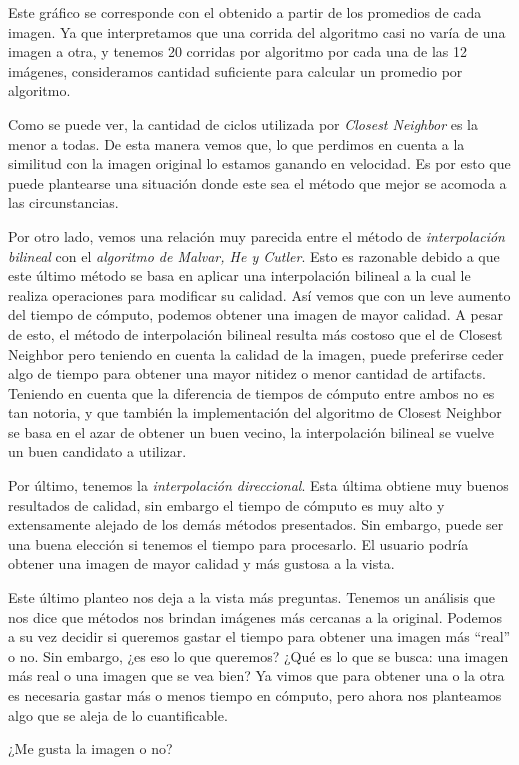 \begin{itemize}
Este gráfico se corresponde con el obtenido a partir de los promedios de cada imagen. Ya que interpretamos que una corrida del algoritmo casi no varía de una imagen a otra, y tenemos 20 corridas por algoritmo por cada una de las 12 imágenes, consideramos cantidad suficiente para calcular un promedio por algoritmo.

Como se puede ver, la cantidad de ciclos utilizada por \textit{Closest Neighbor} es la menor a todas. De esta manera vemos que, lo que perdimos en cuenta a la similitud con la imagen original lo estamos ganando en velocidad. Es por esto que puede plantearse una situación donde este sea el método que mejor se acomoda a las circunstancias. 

Por otro lado, vemos una relación muy parecida entre el método de \textit{interpolación bilineal} con el \textit{algoritmo de Malvar, He y Cutler}. Esto es razonable debido a que este último método se basa en aplicar una interpolación bilineal a la cual le realiza operaciones para modificar su calidad. Así vemos que con un leve aumento del tiempo de cómputo, podemos obtener una imagen de mayor calidad. A pesar de esto, el método de interpolación bilineal resulta más costoso que el de Closest Neighbor pero teniendo en cuenta la calidad de la imagen, puede preferirse ceder algo de tiempo para obtener una mayor nitidez o menor cantidad de artifacts. Teniendo en cuenta que la diferencia de tiempos de cómputo entre ambos no es tan notoria, y que también la implementación del algoritmo de Closest Neighbor se basa en el azar de obtener un buen vecino, la interpolación bilineal se vuelve un buen candidato a utilizar.

Por último, tenemos la \textit{interpolación direccional}. Esta última obtiene muy buenos resultados de calidad, sin embargo el tiempo de cómputo es muy alto y extensamente alejado de los demás métodos presentados.
Sin embargo, puede ser una buena elección si tenemos el tiempo para procesarlo. El usuario podría obtener una imagen de mayor calidad y más gustosa a la vista. 

Este último planteo nos deja a la vista más preguntas. Tenemos un análisis que nos dice que métodos nos brindan imágenes más cercanas a la original. Podemos a su vez decidir si queremos gastar el tiempo para obtener una imagen más ``real'' o no. Sin embargo, ¿es eso lo que queremos? ¿Qué es lo que se busca: una imagen más real o una imagen que se vea bien? Ya vimos que para obtener una o la otra es necesaria gastar más o menos tiempo en cómputo, pero ahora nos planteamos algo que se aleja de lo cuantificable. 

¿Me gusta la imagen o no? 




\end{itemize}

